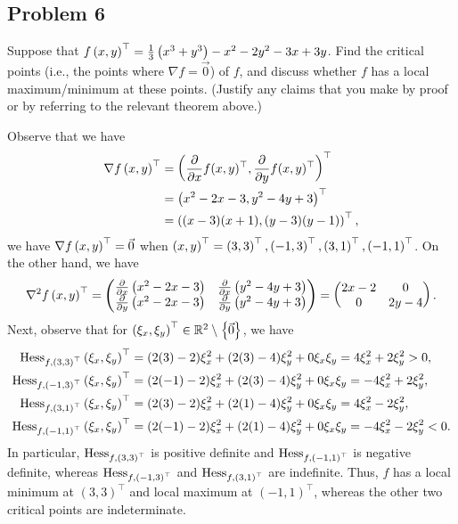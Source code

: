 \documentclass[main.tex]{subfiles}
\begin{document}
\subsection{Problem 6}
\begin{claim}
    Suppose that $f\left( x, y \right)^\top = \frac{1}{3} \left( x^3 + y^3 \right) - x^2 - 2y^2 - 3x + 3y$. Find the critical points (i.e., the points where $\nabla f = \vec{0}$) of $f$, and discuss whether $f$ has a local maximum/minimum at these points. (Justify any claims that you make by proof or by referring to the relevant theorem above.)
\end{claim}

\begin{soln}
    Observe that we have 
    \begin{align*}
        \nabla f\left( x, y \right)^\top &= \left( \pdv{}{x} f(x, y)^\top, \pdv{}{y} f(x, y)^\top \right)^\top \\
        &= \left( x^2 - 2x - 3, y^2 - 4y + 3 \right)^\top \\
        &= \left( (x - 3)(x + 1), (y - 3)(y - 1) \right)^\top,
    \end{align*}
    we have $\nabla f\left( x, y \right)^\top = \vec{0}$ when $\left( x, y \right)^\top = \left( 3, 3 \right)^\top, \left( -1, 3 \right)^\top, \left( 3, 1 \right)^\top, \left( -1, 1 \right)^\top$. On the other hand, we have
    \[\nabla^2 f\left( x, y \right)^\top = \begin{pmatrix}
        \pdv{}{x} \left( x^2 - 2x - 3 \right) & \pdv{}{x} \left( y^2 - 4y + 3 \right) \\
        \pdv{}{y} \left( x^2 - 2x - 3 \right) & \pdv{}{y} \left( y^2 - 4y + 3 \right)
    \end{pmatrix} = \begin{pmatrix}
        2x - 2 & 0 \\
        0 & 2y - 4
    \end{pmatrix}.\]
    Next, observe that for $\left( \xi_x, \xi_y \right)^\top\in \mathbb R^2\setminus\left\{ \vec{0} \right\}$, we have
    \begin{align*}
        \operatorname{Hess}_{f, \left( 3, 3 \right)^\top}\left( \xi_x, \xi_y \right)^\top &= (2(3) - 2)\xi_x^2 + (2(3) - 4)\xi_y^2 + 0\xi_x\xi_y = 4\xi_x^2 + 2\xi_y^2 > 0, \\
        \operatorname{Hess}_{f, \left( -1, 3 \right)^\top}\left( \xi_x, \xi_y \right)^\top &= (2(-1) - 2)\xi_x^2 + (2(3) - 4)\xi_y^2 + 0\xi_x\xi_y = -4\xi_x^2 + 2\xi_y^2, \\
        \operatorname{Hess}_{f, \left( 3, 1 \right)^\top}\left( \xi_x, \xi_y \right)^\top &= (2(3) - 2)\xi_x^2 + (2(1) - 4)\xi_y^2 + 0\xi_x\xi_y = 4\xi_x^2 - 2\xi_y^2, \\
        \operatorname{Hess}_{f, \left( -1, 1 \right)^\top}\left( \xi_x, \xi_y \right)^\top &= (2(-1) - 2)\xi_x^2 + (2(1) - 4)\xi_y^2 + 0\xi_x\xi_y = -4\xi_x^2 - 2\xi_y^2 < 0.
    \end{align*}
    In particular, $\operatorname{Hess}_{f, \left( 3, 3 \right)^\top}$ is positive definite and $\operatorname{Hess}_{f, \left( -1, 1 \right)^\top}$ is negative definite, whereas $\operatorname{Hess}_{f, \left( -1, 3 \right)^\top}$ and $\operatorname{Hess}_{f, \left( 3, 1 \right)^\top}$ are indefinite. Thus, $f$ has a local minimum at $(3, 3)^\top$ and local maximum at $(-1, 1)^\top$, whereas the other two critical points are indeterminate.
\end{soln}
\eject
\end{document}
